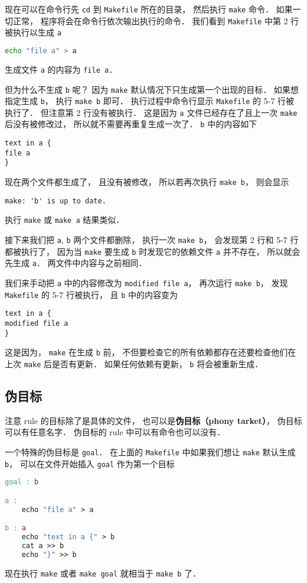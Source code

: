 现在可以在命令行先 \verb|cd| 到 \verb|Makefile| 所在的目录， 然后执行 \verb|make| 命令． 如果一切正常， 程序将会在命令行依次输出执行的命令． 我们看到 \verb|Makefile| 中第 2 行被执行以生成 \verb|a|
\begin{lstlisting}[language=bash]
echo "file a" > a
\end{lstlisting}
生成文件 \verb|a| 的内容为 \verb|file a|．

但为什么不生成 \verb|b| 呢？ 因为 \verb|make| 默认情况下只生成第一个出现的目标． 如果想指定生成 \verb|b|， 执行 \verb|make b| 即可． 执行过程中命令行显示 \verb|Makefile| 的 5-7 行被执行了． 但注意第 2 行没有被执行． 这是因为 \verb|a| 文件已经存在了且上一次 \verb|make| 后没有被修改过， 所以就不需要再重复生成一次了． \verb|b| 中的内容如下
\begin{lstlisting}[language=none]
text in a {
file a
}
\end{lstlisting}

现在两个文件都生成了， 且没有被修改， 所以若再次执行 \verb|make b|， 则会显示
\begin{lstlisting}[language=none]
make: 'b' is up to date.
\end{lstlisting}
执行 \verb|make| 或 \verb|make a| 结果类似．

接下来我们把 \verb|a|, \verb|b| 两个文件都删除， 执行一次 \verb|make b|， 会发现第 2 行和 5-7 行都被执行了， 因为当 \verb|make| 要生成 \verb|b| 时发现它的依赖文件 \verb|a| 并不存在， 所以就会先生成 \verb|a|． 两文件中内容与之前相同．

我们来手动把 \verb|a| 中的内容修改为 \verb|modified file a|， 再次运行 \verb|make b|， 发现 \verb|Makefile| 的 5-7 行被执行， 且 \verb|b| 中的内容变为
\begin{lstlisting}[language=none]
text in a {
modified file a
}
\end{lstlisting}
这是因为， \verb|make| 在生成 \verb|b| 前， 不但要检查它的所有依赖都存在还要检查他们在上次 \verb|make| 后是否有更新． 如果任何依赖有更新， \verb|b| 将会被重新生成．

\subsection{伪目标}
注意 rule 的目标除了是具体的文件， 也可以是\textbf{伪目标（phony tarket）}， 伪目标可以有任意名字． 伪目标的 rule 中可以有命令也可以没有．

一个特殊的伪目标是 \verb|goal|． 在上面的 \verb|Makefile| 中如果我们想让 \verb|make| 默认生成 \verb|b|， 可以在文件开始插入 \verb|goal| 作为第一个目标
\begin{lstlisting}[language=makefile]
goal : b

a :
	echo "file a" > a

b : a
	echo "text in a {" > b
	cat a >> b
	echo "}" >> b
\end{lstlisting}
现在执行 \verb|make| 或者 \verb|make goal| 就相当于 \verb|make b| 了．

